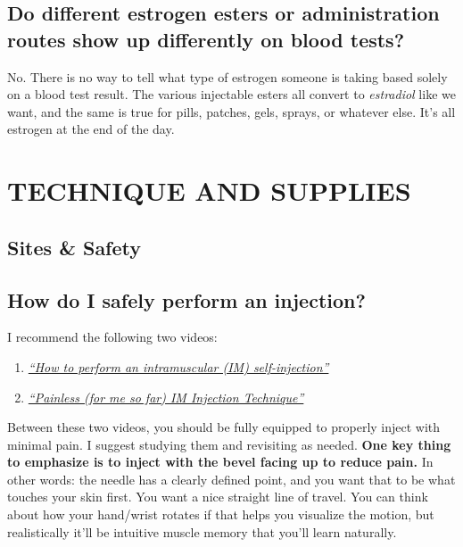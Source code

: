 \documentclass{article}
\begin{document}
\subsection{Do different estrogen esters or administration routes show up differently on blood tests?}\label{4-16}

No. There is no way to tell what type of estrogen someone is taking based solely on a blood test result. The various injectable esters all convert to \textit{estradiol }like we want, and the same is true for pills, patches, gels, sprays, or whatever else. It's all estrogen at the end of the day.

 

\section{TECHNIQUE AND SUPPLIES} \label{ts}

\subsection*{Sites \& Safety}

\subsection{How do I safely perform an injection?}

I recommend the following two videos:

\begin{enumerate}
  \item \href{https://www.youtube.com/watch?v=cBabaGC2Dok}{\textit{“How to perform an intramuscular (IM) self-injection”}}
  \item \href{https://www.youtube.com/watch?v=YfNlAZLxLyw}{\textit{“Painless (for me so far) IM Injection Technique”}}
\end{enumerate}

Between these two videos, you should be fully equipped to properly inject with minimal pain. I suggest studying them and revisiting as needed. \textbf{One key thing to emphasize is to inject with the bevel facing up to reduce pain.} In other words: the needle has a clearly defined point, and you want that to be what touches your skin first. You want a nice straight line of travel. You can think about how your hand/wrist rotates if that helps you visualize the motion, but realistically it'll be intuitive muscle memory that you'll learn naturally.
\end{document}
